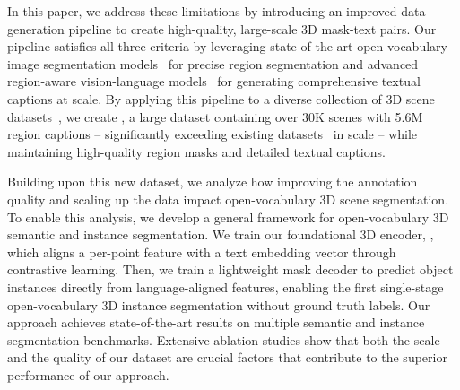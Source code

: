 In this paper, we address these limitations by introducing an improved data generation pipeline to create high-quality, large-scale 3D mask-text pairs.
Our pipeline satisfies all three criteria by leveraging state-of-the-art open-vocabulary image segmentation models~\cite{liu2023grounding,sam,ravi2024sam,zou2024segment} for precise region segmentation and advanced region-aware vision-language models~\cite{yuan2024osprey} for generating comprehensive textual captions at scale.
By applying this pipeline to a diverse collection of 3D scene datasets~\cite{dai2017scannet,yeshwanth2023scannet++,baruch2021arkitscenes,chang2017matterport3d,zheng2020structured3d}, we create \textbf{\dataname}, a large dataset containing over 30K scenes with 5.6M region captions -- significantly exceeding existing datasets~\cite{yang2024regionplc,jiang2024open} in scale -- while maintaining high-quality region masks and detailed textual captions.

Building upon this new dataset, we analyze how improving the annotation quality and scaling up the data impact open-vocabulary 3D scene segmentation.
To enable this analysis, we develop a general framework for open-vocabulary 3D semantic and instance segmentation.
We train our foundational 3D encoder, \textbf{\nickname}, which aligns a per-point feature with a text embedding vector through contrastive learning.
Then, we train a lightweight mask decoder to predict object instances directly from language-aligned features, enabling the first single-stage open-vocabulary 3D instance segmentation without ground truth labels.
Our approach achieves state-of-the-art results on multiple semantic and instance segmentation benchmarks.
Extensive ablation studies show that both the scale and the quality of our dataset are crucial factors that contribute to the superior performance of our approach.
